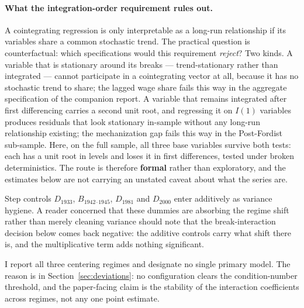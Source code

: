 \documentclass[11pt,a4paper]{article}
\begin{document}
\paragraph{What the integration-order requirement rules out.} A cointegrating regression is only interpretable as a long-run relationship if its variables share a common stochastic trend. The practical question is counterfactual: which specifications would this requirement \textit{reject}? Two kinds. A variable that is stationary around its breaks --- trend-stationary rather than integrated --- cannot participate in a cointegrating vector at all, because it has no stochastic trend to share; the lagged wage share fails this way in the aggregate specification of the companion report. A variable that remains integrated after first differencing carries a second unit root, and regressing it on $I(1)$ variables produces residuals that look stationary in-sample without any long-run relationship existing; the mechanization gap fails this way in the Post-Fordist sub-sample. Here, on the full sample, all three base variables survive both tests: each has a unit root in levels and loses it in first differences, tested under broken deterministics. The route is therefore \textbf{formal} rather than exploratory, and the estimates below are not carrying an unstated caveat about what the series are.

Step controls $D_{1933}$, $B_{1942\text{--}1945}$, $D_{1981}$ and $D_{2000}$ enter additively as variance hygiene. A reader concerned that these dummies are absorbing the regime shift rather than merely cleaning variance should note that the break-interaction decision below comes back negative: the additive controls carry what shift there is, and the multiplicative term adds nothing significant.

I report all three centering regimes and designate no single primary model. The reason is in Section~\ref{sec:deviations}: no configuration clears the condition-number threshold, and the paper-facing claim is the stability of the interaction coefficients across regimes, not any one point estimate.
\end{document}
